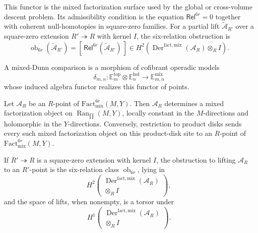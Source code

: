 \begin{defn}
  This functor is the mixed factorization surface used by the global or
  cross-volume descent problem.  Its admissibility condition is the equation
  \(\mathsf{Rel}^{6r}=0\) together with coherent
  null-homotopies in square-zero families.  For a partial lift
  \(\widetilde{\mathcal A}_{R'}\) over a square-zero extension
  \(R'\twoheadrightarrow R\) with kernel \(I\), the six-relation
  obstruction is
  \[
    \operatorname{ob}_{6r}(\widetilde{\mathcal A}_{R'})
      =
    [\,\mathsf{Rel}^{6r}(\widetilde{\mathcal A}_{R'})\,]
      \in
    H^2\!\left(
      \operatorname{Der}^{\mathrm{fact,mix}}(\mathcal A_R)\otimes_R I
    \right).
  \]

  A mixed-Dunn comparison is a morphism of cofibrant operadic models
  \[
    \delta_{m,n}\colon
    \mathbb E_m^{\mathrm{top}}\otimes\mathbb E_n^{\mathrm{hol}}
      \longrightarrow
    \mathbb E_{m,n}^{\mathrm{mix}}
  \]
  whose induced algebra functor realizes this functor of points.
\end{defn}

\begin{prop}\label{prop:fact6r-functor-of-points-recognition}
  Let \(\mathcal A_R\) be an \(R\)-point of
  \(\mathrm{Fact}^{6r}_{\mathrm{mix}}(M,Y)\).  Then \(\mathcal A_R\)
  determines a mixed factorization object on
  \(\operatorname{Ran}_{\prod}(M,Y)\), locally constant in the
  \(M\)-directions and holomorphic in the \(Y\)-directions.  Conversely,
  restriction to product disks sends every such mixed factorization
  object on this product-disk site to an \(R\)-point of
  \(\mathrm{Fact}^{6r}_{\mathrm{mix}}(M,Y)\).

  If \(R'\twoheadrightarrow R\) is a square-zero extension with kernel
  \(I\), the obstruction to lifting \(\mathcal A_R\) to an
  \(R'\)-point is the six-relation class
  \(\operatorname{ob}_{6r}\), lying in
  \[
    H^2\!\left(
      \begin{gathered}
        \operatorname{Der}^{\mathrm{fact,mix}}(\mathcal A_R)\\
        \otimes_R I
      \end{gathered}
    \right),
  \]
  and the space of lifts, when nonempty, is a torsor under
  \[
    H^1\!\left(
      \begin{gathered}
        \operatorname{Der}^{\mathrm{fact,mix}}(\mathcal A_R)\\
        \otimes_R I
      \end{gathered}
    \right).
  \]
\end{prop}

